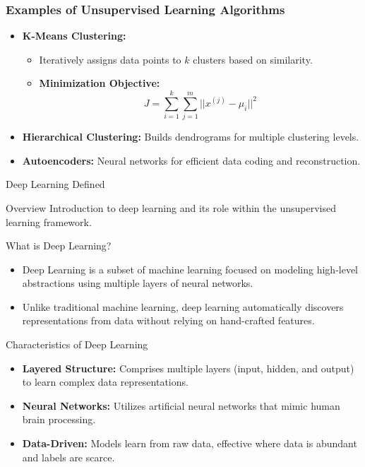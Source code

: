 \documentclass[aspectratio=169]{beamer}
\begin{document}
\begin{frame}[fragile]
    \frametitle{Examples of Unsupervised Learning Algorithms}

    \begin{itemize}
        \item \textbf{K-Means Clustering:}
        \begin{itemize}
            \item Iteratively assigns data points to $k$ clusters based on similarity.
            \item \textbf{Minimization Objective:}
            \begin{equation}
            J = \sum_{i=1}^{k} \sum_{j=1}^{m} || x^{(j)} - \mu_i ||^2
            \end{equation}
        \end{itemize}
        
        \item \textbf{Hierarchical Clustering:} Builds dendrograms for multiple clustering levels.
        
        \item \textbf{Autoencoders:} Neural networks for efficient data coding and reconstruction.
    \end{itemize}
\end{frame}

\begin{frame}[fragile]{Deep Learning Defined}
    \begin{block}{Overview}
        Introduction to deep learning and its role within the unsupervised learning framework.
    \end{block}
\end{frame}

\begin{frame}[fragile]{What is Deep Learning?}
    \begin{itemize}
        \item Deep Learning is a subset of machine learning focused on modeling high-level abstractions using multiple layers of neural networks.
        \item Unlike traditional machine learning, deep learning automatically discovers representations from data without relying on hand-crafted features.
    \end{itemize}
\end{frame}

\begin{frame}[fragile]{Characteristics of Deep Learning}
    \begin{itemize}
        \item \textbf{Layered Structure:} Comprises multiple layers (input, hidden, and output) to learn complex data representations.
        \item \textbf{Neural Networks:} Utilizes artificial neural networks that mimic human brain processing.
        \item \textbf{Data-Driven:} Models learn from raw data, effective where data is abundant and labels are scarce.
    \end{itemize}
\end{frame}
\end{document}
